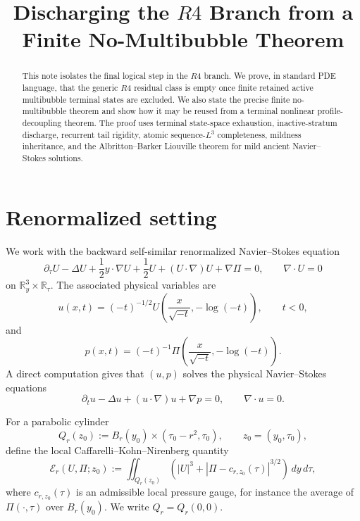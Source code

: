 \documentclass[11pt]{article}
\title{Discharging the \(R4\) Branch from a Finite No-Multibubble Theorem}
\author{}
\date{}
\numberwithin{equation}{section}
\newcommand{\R}{\mathbb R}
\newcommand{\cE}{\mathcal E}
\begin{document}
\maketitle

\begin{abstract}
This note isolates the final logical step in the \(R4\) branch.  We prove, in
standard PDE language, that the generic \(R4\) residual class is empty once
finite retained active multibubble terminal states are excluded.  We also state
the precise finite no-multibubble theorem and show how it may be reused from a
terminal nonlinear profile-decoupling theorem.  The proof uses terminal
state-space exhaustion, inactive-stratum discharge, recurrent tail rigidity,
atomic sequence-\(L^3\) completeness, mildness inheritance, and the
Albritton--Barker Liouville theorem for mild ancient Navier--Stokes solutions.
\end{abstract}

\tableofcontents

\section{Renormalized setting}

We work with the backward self-similar renormalized Navier--Stokes equation
\begin{equation}
  \partial_\tau U-\Delta U+\frac12 y\cdot\nabla U+\frac12 U
  +(U\cdot\nabla)U+\nabla\Pi=0,
  \qquad
  \nabla\cdot U=0
  \label{eq:rnse}
\end{equation}
on \(\R^3_y\times\R_\tau\).  The associated physical variables are
\begin{equation}
  u(x,t)=(-t)^{-1/2}
  U\!\left(\frac{x}{\sqrt{-t}},-\log(-t)\right),
  \qquad t<0,
  \label{eq:pullback-u}
\end{equation}
and
\begin{equation}
  p(x,t)=(-t)^{-1}
  \Pi\!\left(\frac{x}{\sqrt{-t}},-\log(-t)\right).
  \label{eq:pullback-p}
\end{equation}
A direct computation gives that \((u,p)\) solves the physical Navier--Stokes
equations
\begin{equation}
  \partial_tu-\Delta u+(u\cdot\nabla)u+\nabla p=0,
  \qquad
  \nabla\cdot u=0.
  \label{eq:physical-ns}
\end{equation}

For a parabolic cylinder
\[
  Q_r(z_0):=B_r(y_0)\times(\tau_0-r^2,\tau_0),
  \qquad z_0=(y_0,\tau_0),
\]
define the local Caffarelli--Kohn--Nirenberg quantity
\begin{equation}
  \cE_r(U,\Pi;z_0)
  :=
  \iint_{Q_r(z_0)}
  \left(
    |U|^3+\left|\Pi-c_{r,z_0}(\tau)\right|^{3/2}
  \right)\,dy\,d\tau,
  \label{eq:local-ckn}
\end{equation}
where \(c_{r,z_0}(\tau)\) is an admissible local pressure gauge, for instance
the average of \(\Pi(\cdot,\tau)\) over \(B_r(y_0)\).  We write \(Q_r=Q_r(0,0)\).
\end{document}
